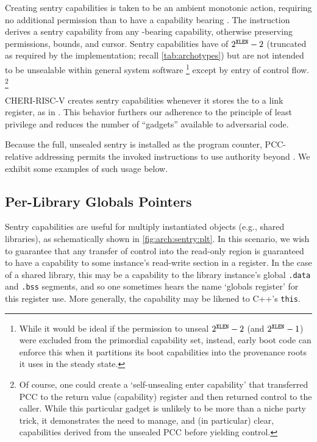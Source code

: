 Creating sentry capabilities is taken to be an ambient monotonic action,
requiring no additional permission than to have a capability bearing
\cappermX.
%
The  instruction derives a sentry capability from any
\cappermX-bearing capability, otherwise preserving permissions, bounds,
and cursor.
%
Sentry capabilities have \cotype{} of $2^{{\texttt{XLEN}}{}}-2$ (truncated as required by the
implementation; recall \cref{tab:archotypes}) but are not intended to be
unsealable within general system software%
%
\footnote{While it would be ideal if the permission to unseal \cotype{}
$2^{{\texttt{XLEN}}{}}-2$ (and $2^{{\texttt{XLEN}}{}}-1$) were excluded from the primordial capability set,
instead, early boot code can enforce this when it partitions its boot
capabilities into the provenance roots it uses in the steady state.}
%
except by entry of control flow.%
%
\footnote{Of course, one could create a `self-unsealing enter capability' that
transferred PCC to the return value (capability) register and then returned
control to the caller.  While this particular gadget is unlikely to be more
than a niche party trick, it demonstrates the need to manage, and (in
particular) clear, capabilities derived from the unsealed PCC before yielding
control.}

CHERI-RISC-V creates sentry capabilities
whenever it stores the \PCC{} to a link register, as in .
This behavior furthers our adherence
to the principle of least privilege and reduces the number of ``gadgets''
available to adversarial code.

Because the full, unsealed sentry is installed as the program counter,
PCC-relative addressing permits the invoked instructions to use authority
beyond \cappermX.  We exhibit some examples of such usage below.


\subsection{Per-Library Globals Pointers}

Sentry capabilities are useful for multiply instantiated objects (e.g., shared
libraries), as schematically shown in \cref{fig:arch:sentry:plt}.  In this
scenario, we wish to guarantee that any transfer of control into the read-only
region is guaranteed to have a capability to some instance's read-write section
in a register.  In the case of a shared library, this may be a capability to
the library instance's global \texttt{.data} and \texttt{.bss} segments, and so
one sometimes hears the name `globals register' for this register use.  More
generally, the capability may be likened to C++'s \texttt{this}.

